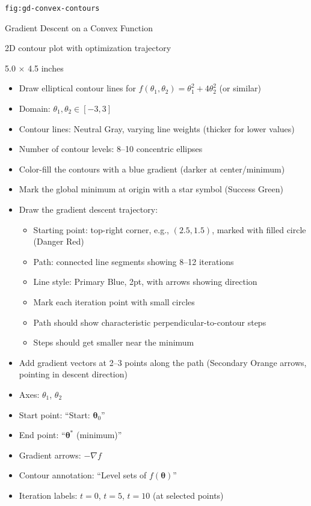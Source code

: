 \documentclass[12pt]{article}
\begin{document}
\begin{description}[style=nextline, leftmargin=0pt]
    \item[Figure ID] \texttt{fig:gd-convex-contours}
    \item[Title] Gradient Descent on a Convex Function
    \item[Type] 2D contour plot with optimization trajectory
    \item[Size] 5.0 $\times$ 4.5 inches

    \item[Visual Description]
    \begin{itemize}
        \item Draw elliptical contour lines for $f(\theta_1, \theta_2) = \theta_1^2 + 4\theta_2^2$ (or similar)
        \item Domain: $\theta_1, \theta_2 \in [-3, 3]$
        \item Contour lines: Neutral Gray, varying line weights (thicker for lower values)
        \item Number of contour levels: 8--10 concentric ellipses
        \item Color-fill the contours with a blue gradient (darker at center/minimum)
        \item Mark the global minimum at origin with a star symbol (Success Green)
        \item Draw the gradient descent trajectory:
        \begin{itemize}
            \item Starting point: top-right corner, e.g., $(2.5, 1.5)$, marked with filled circle (Danger Red)
            \item Path: connected line segments showing 8--12 iterations
            \item Line style: Primary Blue, 2pt, with arrows showing direction
            \item Mark each iteration point with small circles
            \item Path should show characteristic perpendicular-to-contour steps
            \item Steps should get smaller near the minimum
        \end{itemize}
        \item Add gradient vectors at 2--3 points along the path (Secondary Orange arrows, pointing in descent direction)
    \end{itemize}

    \item[Required Labels]
    \begin{itemize}
        \item Axes: $\theta_1$, $\theta_2$
        \item Start point: ``Start: $\boldsymbol{\theta}_0$''
        \item End point: ``$\boldsymbol{\theta}^*$ (minimum)''
        \item Gradient arrows: $-\nabla f$
        \item Contour annotation: ``Level sets of $f(\boldsymbol{\theta})$''
        \item Iteration labels: $t=0$, $t=5$, $t=10$ (at selected points)
    \end{itemize}


\end{description}
\end{document}
